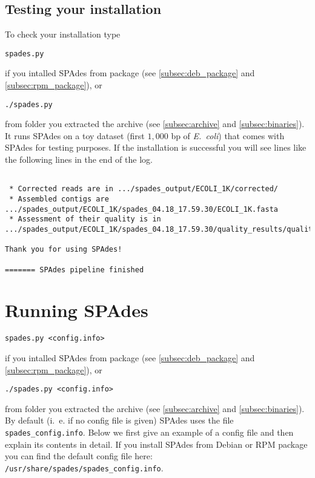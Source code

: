 \documentclass{article}
\def\spades{SPAdes}
\def\ecoli{\it E.~coli}
\begin{document}
\subsection{Testing your installation}
To check your installation type
\begin{lstlisting}
spades.py
\end{lstlisting}
if you intalled {\spades} from package (see \ref{subsec:deb_package} and \ref{subsec:rpm_package}), or 
\begin{lstlisting}
./spades.py
\end{lstlisting}
from folder you extracted the archive (see \ref{subsec:archive} and \ref{subsec:binaries}).
It runs {\spades} on a toy dataset (first $1{,}000$ bp of {\ecoli}) that comes with {\spades} for testing purposes.
If the installation is successful you will see lines like the following lines in the end of the log.
\begin{lstlisting}

 * Corrected reads are in .../spades_output/ECOLI_1K/corrected/
 * Assembled contigs are .../spades_output/ECOLI_1K/spades_04.18_17.59.30/ECOLI_1K.fasta
 * Assessment of their quality is in 
.../spades_output/ECOLI_1K/spades_04.18_17.59.30/quality_results/quality.txt

Thank you for using SPAdes!

======= SPAdes pipeline finished
\end{lstlisting}%



\section{Running {\spades}}\label{sec:running}
\begin{lstlisting}
spades.py <config.info>
\end{lstlisting}
if you intalled {\spades} from package (see \ref{subsec:deb_package} and \ref{subsec:rpm_package}), or 
\begin{lstlisting}
./spades.py <config.info>
\end{lstlisting}
from folder you extracted the archive (see \ref{subsec:archive} and \ref{subsec:binaries}).
By default (i.~e. if no config file is given) {\spades} uses the file {\tt spades\_config.info}. 
Below we first give an example of a config file
and then explain its contents in detail. If you install {\spades} from Debian or RPM package you can find the default config file here: {\tt  /usr/share/spades/spades\_config.info}.%
\end{document}

